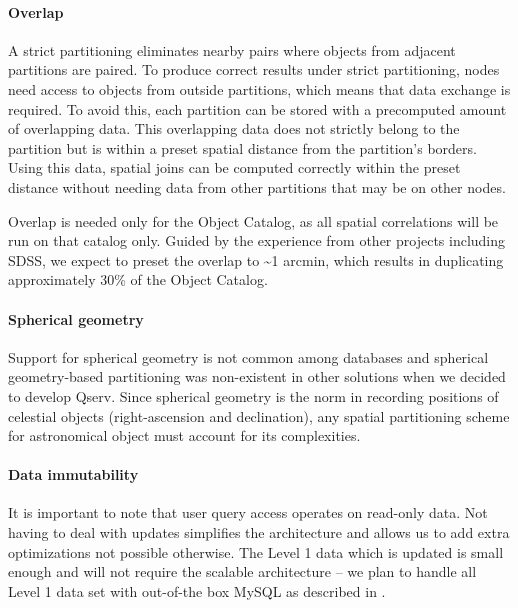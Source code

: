 \documentclass[DM,lsstdraft,toc]{lsstdoc}
\begin{document}
\paragraph{Overlap}\label{overlap}

A strict partitioning eliminates nearby pairs where objects from
adjacent partitions are paired. To produce correct results under strict
partitioning, nodes need access to objects from outside partitions,
which means that data exchange is required. To avoid this, each
partition can be stored with a precomputed amount of overlapping data.
This overlapping data does not strictly belong to the partition but is
within a preset spatial distance from the partition's borders. Using
this data, spatial joins can be computed correctly within the preset
distance without needing data from other partitions that may be on other
nodes.

Overlap is needed only for the Object Catalog, as all spatial
correlations will be run on that catalog only. Guided by the experience
from other projects including SDSS, we expect to preset the overlap to
\textasciitilde{}1 arcmin, which results in duplicating approximately
30\% of the Object Catalog.

\paragraph{Spherical geometry}\label{spherical-geometry}

Support for spherical geometry is not common among databases and
spherical geometry-based partitioning was non-existent in other
solutions when we decided to develop Qserv. Since spherical geometry is
the norm in recording positions of celestial objects (right-ascension
and declination), any spatial partitioning scheme for astronomical
object must account for its complexities.

\paragraph{Data immutability}\label{data-immutability}

It is important to note that user query access operates on read-only
data. Not having to deal with updates simplifies the architecture and
allows us to add extra optimizations not possible otherwise. The Level 1
data which is updated is small enough and will not require the scalable
architecture -- we plan to handle all Level 1 data set with out-of-the
box MySQL as described in .
\end{document}
